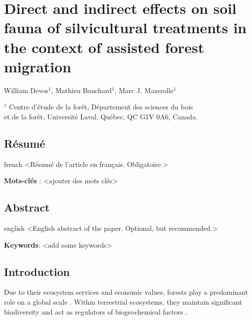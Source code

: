 \chapter{Direct and indirect effects on soil fauna of silvicultural treatments in the context of assisted forest migration}     %
\label{chapitre1-articles}    

William Devos$^1$, Mathieu Bouchard$^1$, Marc J. Mazerolle$^1$

$^1$ Centre d'étude de la forêt, Département des sciences du bois \\ 
et de la forêt, Université Laval, Québec, QC G1V 0A6, Canada. \\ 

\clearpage

\section*{Résumé}
\label{sec:resume1}

\begin{otherlanguage*}{french}
  <Résumé de l'article en français. Obligatoire.>

  \textbf{Mots-clés} : <ajouter des mots clés>
\end{otherlanguage*}

\clearpage

\section*{Abstract}
\label{sec:abstract1}

\begin{otherlanguage*}{english}
  <English abstract of the paper. Optional, but recommended.>

\textbf{Keywords}: <add some keywords> 
\end{otherlanguage*}

\cleardoublepage

\section*{Introduction}
\label{sec:intro1}


Due to their ecosystem services and economic values, forests play a predominant role on a global scale \citep{Balvanera2006Quantifyingevidence}. 
Within terrestrial ecosystems, they maintain significant biodiversity and act as regulators of biogeochemical factors \citep{Pawson2013Plantationforests}. 

